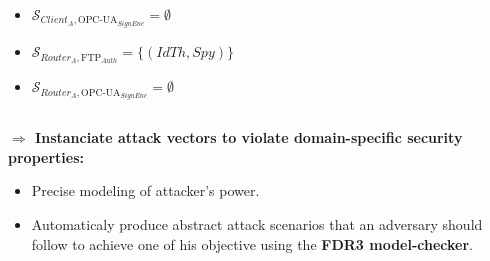 \documentclass{beamer}
\newcommand{\ftpauth}{FTP$_{Auth}$\xspace}
\newcommand{\opcuasignenc}{OPC-UA$_{SignEnc}$\xspace}
\begin{document}
\begin{frame}[fragile]{}
\begin{tcolorbox}[adjusted title={\centering\large Attack models}]
\begin{columns}[T]
\begin{column}{.65\textwidth}
\begin{tcolorbox}
\begin{columns}[c]
\begin{column}{.4\textwidth}
\begin{itemize}
                                \item $\mathcal{S}_{Client_{A},\text{\opcuasignenc}} = \emptyset$
                                \item $\mathcal{S}_{Router_{A},\text{\ftpauth}} = \{ (IdTh, Spy) \}$
                                \item $\mathcal{S}_{Router_{A},\text{\opcuasignenc}} = \emptyset$
                            \end{itemize}
                        \end{column}
                    \end{columns}
               \end{tcolorbox}
            \end{column}
        \end{columns}
    \end{tcolorbox}
    \vspace{.25em}
    \begin{tcolorbox}[adjusted title={\centering\large Smart-Fuzzing of Industrial Systems}]
        \vspace{.5em}
        \begin{columns}[T]
            \begin{column}{.35\textwidth}
                \begin{tcolorbox}[
                colback=white, %
                colframe=normalTitleBlockColor, %
                colframe=gray!20, %
                boxrule=1mm,
                coltext=black, %
                coltitle=black, %
                bottom=2mm,
                equal height group=C,
                valign = center,
                adjusted title={\large Objectives}]
                    \vspace{.5em}
                    {\bf $\Rightarrow$ Instanciate attack vectors to violate domain-specific security properties:}
                    \begin{itemize}
                        \item Precise modeling of attacker's power.
                        \vspace{.5em}
                        \item Automaticaly produce abstract attack scenarios that an adversary should follow to achieve one of his objective using the {\bf FDR3 model-checker}.
                        \vspace{.5em}

\end{itemize}
\end{tcolorbox}
\end{column}
\end{columns}
\end{tcolorbox}
\end{frame}
\end{document}

